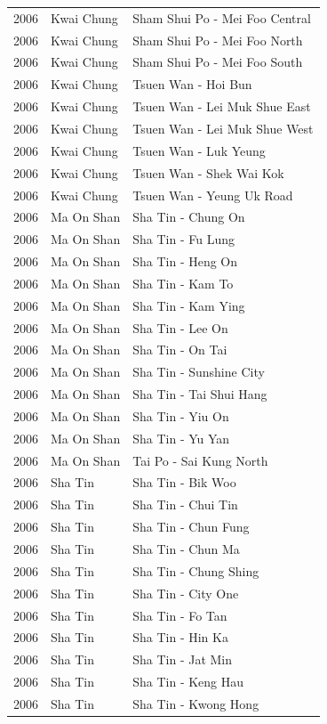 \begin{longtable}{p{1.2cm}p{3cm}p{7cm}}
2006 & Kwai Chung & Sham Shui Po - Mei Foo Central \\
2006 & Kwai Chung & Sham Shui Po - Mei Foo North \\
2006 & Kwai Chung & Sham Shui Po - Mei Foo South \\
2006 & Kwai Chung & Tsuen Wan - Hoi Bun \\
2006 & Kwai Chung & Tsuen Wan - Lei Muk Shue East \\
2006 & Kwai Chung & Tsuen Wan - Lei Muk Shue West \\
2006 & Kwai Chung & Tsuen Wan - Luk Yeung \\
2006 & Kwai Chung & Tsuen Wan - Shek Wai Kok \\
2006 & Kwai Chung & Tsuen Wan - Yeung Uk Road \\
2006 & Ma On Shan & Sha Tin - Chung On \\
2006 & Ma On Shan & Sha Tin - Fu Lung \\
2006 & Ma On Shan & Sha Tin - Heng On \\
2006 & Ma On Shan & Sha Tin - Kam To \\
2006 & Ma On Shan & Sha Tin - Kam Ying \\
2006 & Ma On Shan & Sha Tin - Lee On \\
2006 & Ma On Shan & Sha Tin - On Tai \\
2006 & Ma On Shan & Sha Tin - Sunshine City \\
2006 & Ma On Shan & Sha Tin - Tai Shui Hang \\
2006 & Ma On Shan & Sha Tin - Yiu On \\
2006 & Ma On Shan & Sha Tin - Yu Yan \\
2006 & Ma On Shan & Tai Po - Sai Kung North \\
2006 & Sha Tin & Sha Tin - Bik Woo \\
2006 & Sha Tin & Sha Tin - Chui Tin \\
2006 & Sha Tin & Sha Tin - Chun Fung \\
2006 & Sha Tin & Sha Tin - Chun Ma \\
2006 & Sha Tin & Sha Tin - Chung Shing \\
2006 & Sha Tin & Sha Tin - City One \\
2006 & Sha Tin & Sha Tin - Fo Tan \\
2006 & Sha Tin & Sha Tin - Hin Ka \\
2006 & Sha Tin & Sha Tin - Jat Min \\
2006 & Sha Tin & Sha Tin - Keng Hau \\
2006 & Sha Tin & Sha Tin - Kwong Hong \\

\end{longtable}
